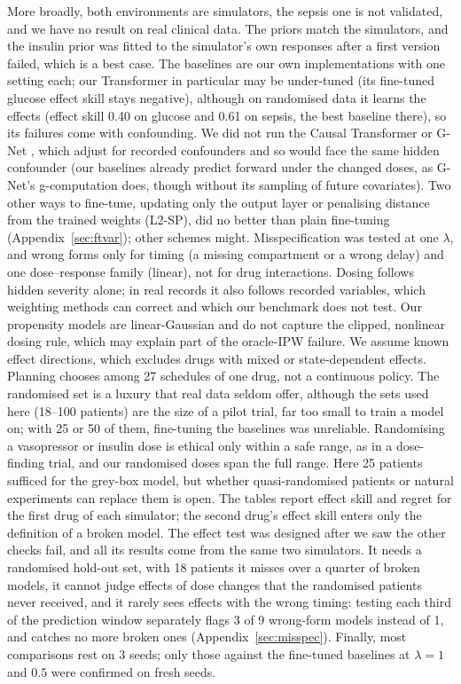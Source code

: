 \documentclass[letterpaper]{article}
\begin{document}
More broadly, both environments are simulators, the sepsis one is not validated, and we have no result on real clinical data. The priors match the simulators, and the insulin prior was fitted to the simulator's own responses after a first version failed, which is a best case. The baselines are our own implementations with one setting each; our Transformer in particular may be under-tuned (its fine-tuned glucose effect skill stays negative), although on randomised data it learns the effects (effect skill 0.40 on glucose and 0.61 on sepsis, the best baseline there), so its failures come with confounding. We did not run the Causal Transformer \citep{melnychuk2022causal} or G-Net \citep{li2021gnet}, which adjust for recorded confounders and so would face the same hidden confounder (our baselines already predict forward under the changed doses, as G-Net's g-computation does, though without its sampling of future covariates). Two other ways to fine-tune, updating only the output layer or penalising distance from the trained weights (L2-SP), did no better than plain fine-tuning (Appendix~\ref{sec:ftvar}); other schemes might. Misspecification was tested at one $\lambda$, and wrong forms only for timing (a missing compartment or a wrong delay) and one dose--response family (linear), not for drug interactions. Dosing follows hidden severity alone; in real records it also follows recorded variables, which weighting methods can correct and which our benchmark does not test. Our propensity models are linear-Gaussian and do not capture the clipped, nonlinear dosing rule, which may explain part of the oracle-IPW failure. We assume known effect directions, which excludes drugs with mixed or state-dependent effects. Planning chooses among 27 schedules of one drug, not a continuous policy. The randomised set is a luxury that real data seldom offer, although the sets used here (18--100 patients) are the size of a pilot trial, far too small to train a model on; with 25 or 50 of them, fine-tuning the baselines was unreliable. Randomising a vasopressor or insulin dose is ethical only within a safe range, as in a dose-finding trial, and our randomised doses span the full range. Here 25 patients sufficed for the grey-box model, but whether quasi-randomised patients or natural experiments can replace them is open. The tables report effect skill and regret for the first drug of each simulator; the second drug's effect skill enters only the definition of a broken model. The effect test was designed after we saw the other checks fail, and all its results come from the same two simulators. It needs a randomised hold-out set, with 18 patients it misses over a quarter of broken models, it cannot judge effects of dose changes that the randomised patients never received, and it rarely sees effects with the wrong timing: testing each third of the prediction window separately flags 3 of 9 wrong-form models instead of 1, and catches no more broken ones (Appendix~\ref{sec:misspec}). Finally, most comparisons rest on 3 seeds; only those against the fine-tuned baselines at $\lambda=1$ and $0.5$ were confirmed on fresh seeds.
\end{document}
